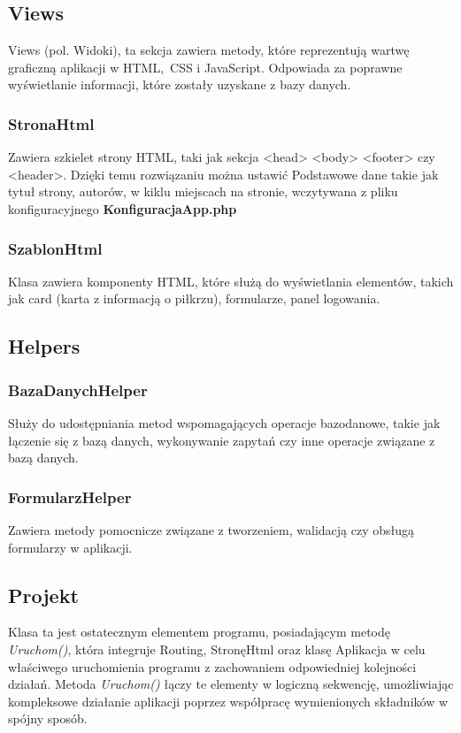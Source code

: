 \subsection{Views}
    Views (pol. Widoki), ta sekcja zawiera metody, które reprezentują wartwę graficzną aplikacji w HTML, CSS i JavaScript. Odpowiada za poprawne wyświetlanie informacji, które zostały uzyskane z bazy danych.
    \subsubsection{StronaHtml}
    Zawiera szkielet strony HTML, taki jak sekcja <head> <body> <footer> czy <header>. Dzięki temu rozwiązaniu można ustawić Podstawowe dane takie jak tytuł strony, autorów, w kiklu miejscach na stronie, wczytywana z pliku konfiguracyjnego \textbf{KonfiguracjaApp.php}
     

    \subsubsection{SzablonHtml}
    Klasa zawiera komponenty HTML, które służą do wyświetlania elementów, takich jak card (karta z informacją o piłkrzu), formularze, panel logowania.
     


\subsection{Helpers}

    \subsubsection{BazaDanychHelper}
    Służy do udostępniania metod wspomagających operacje bazodanowe, takie jak łączenie się z bazą danych, wykonywanie zapytań czy inne operacje związane z bazą danych. 
     


    \subsubsection{FormularzHelper}
    Zawiera metody pomocnicze związane z tworzeniem, walidacją czy obsługą formularzy w aplikacji.
     

    
\subsection{Projekt}
    Klasa ta jest ostatecznym elementem programu, posiadającym metodę \textit{Uruchom()}, która integruje Routing, StronęHtml oraz klasę Aplikacja w celu właściwego uruchomienia programu z zachowaniem odpowiedniej kolejności działań. Metoda \textit{Uruchom()} łączy te elementy w logiczną sekwencję, umożliwiając kompleksowe działanie aplikacji poprzez współpracę wymienionych składników w spójny sposób.
     

